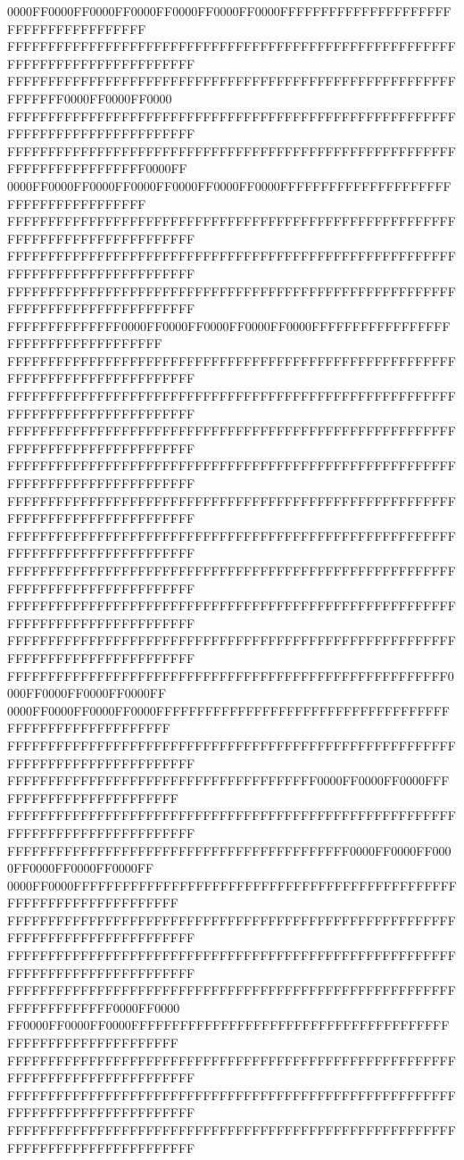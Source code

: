 0000FF0000FF0000FF0000FF0000FF0000FF0000FFFFFFFFFFFFFFFFFFFFFFFFFFFFFFFFFFFFFF
FFFFFFFFFFFFFFFFFFFFFFFFFFFFFFFFFFFFFFFFFFFFFFFFFFFFFFFFFFFFFFFFFFFFFFFFFFFFFF
FFFFFFFFFFFFFFFFFFFFFFFFFFFFFFFFFFFFFFFFFFFFFFFFFFFFFFFFFFFFFF0000FF0000FF0000
FFFFFFFFFFFFFFFFFFFFFFFFFFFFFFFFFFFFFFFFFFFFFFFFFFFFFFFFFFFFFFFFFFFFFFFFFFFFFF
FFFFFFFFFFFFFFFFFFFFFFFFFFFFFFFFFFFFFFFFFFFFFFFFFFFFFFFFFFFFFFFFFFFFFFFF0000FF
0000FF0000FF0000FF0000FF0000FF0000FF0000FFFFFFFFFFFFFFFFFFFFFFFFFFFFFFFFFFFFFF
FFFFFFFFFFFFFFFFFFFFFFFFFFFFFFFFFFFFFFFFFFFFFFFFFFFFFFFFFFFFFFFFFFFFFFFFFFFFFF
FFFFFFFFFFFFFFFFFFFFFFFFFFFFFFFFFFFFFFFFFFFFFFFFFFFFFFFFFFFFFFFFFFFFFFFFFFFFFF
FFFFFFFFFFFFFFFFFFFFFFFFFFFFFFFFFFFFFFFFFFFFFFFFFFFFFFFFFFFFFFFFFFFFFFFFFFFFFF
FFFFFFFFFFFFFF0000FF0000FF0000FF0000FF0000FFFFFFFFFFFFFFFFFFFFFFFFFFFFFFFFFFFF
FFFFFFFFFFFFFFFFFFFFFFFFFFFFFFFFFFFFFFFFFFFFFFFFFFFFFFFFFFFFFFFFFFFFFFFFFFFFFF
FFFFFFFFFFFFFFFFFFFFFFFFFFFFFFFFFFFFFFFFFFFFFFFFFFFFFFFFFFFFFFFFFFFFFFFFFFFFFF
FFFFFFFFFFFFFFFFFFFFFFFFFFFFFFFFFFFFFFFFFFFFFFFFFFFFFFFFFFFFFFFFFFFFFFFFFFFFFF
FFFFFFFFFFFFFFFFFFFFFFFFFFFFFFFFFFFFFFFFFFFFFFFFFFFFFFFFFFFFFFFFFFFFFFFFFFFFFF
FFFFFFFFFFFFFFFFFFFFFFFFFFFFFFFFFFFFFFFFFFFFFFFFFFFFFFFFFFFFFFFFFFFFFFFFFFFFFF
FFFFFFFFFFFFFFFFFFFFFFFFFFFFFFFFFFFFFFFFFFFFFFFFFFFFFFFFFFFFFFFFFFFFFFFFFFFFFF
FFFFFFFFFFFFFFFFFFFFFFFFFFFFFFFFFFFFFFFFFFFFFFFFFFFFFFFFFFFFFFFFFFFFFFFFFFFFFF
FFFFFFFFFFFFFFFFFFFFFFFFFFFFFFFFFFFFFFFFFFFFFFFFFFFFFFFFFFFFFFFFFFFFFFFFFFFFFF
FFFFFFFFFFFFFFFFFFFFFFFFFFFFFFFFFFFFFFFFFFFFFFFFFFFFFFFFFFFFFFFFFFFFFFFFFFFFFF
FFFFFFFFFFFFFFFFFFFFFFFFFFFFFFFFFFFFFFFFFFFFFFFFFFFFFF0000FF0000FF0000FF0000FF
0000FF0000FF0000FF0000FFFFFFFFFFFFFFFFFFFFFFFFFFFFFFFFFFFFFFFFFFFFFFFFFFFFFFFF
FFFFFFFFFFFFFFFFFFFFFFFFFFFFFFFFFFFFFFFFFFFFFFFFFFFFFFFFFFFFFFFFFFFFFFFFFFFFFF
FFFFFFFFFFFFFFFFFFFFFFFFFFFFFFFFFFFFFF0000FF0000FF0000FFFFFFFFFFFFFFFFFFFFFFFF
FFFFFFFFFFFFFFFFFFFFFFFFFFFFFFFFFFFFFFFFFFFFFFFFFFFFFFFFFFFFFFFFFFFFFFFFFFFFFF
FFFFFFFFFFFFFFFFFFFFFFFFFFFFFFFFFFFFFFFFFF0000FF0000FF0000FF0000FF0000FF0000FF
0000FF0000FFFFFFFFFFFFFFFFFFFFFFFFFFFFFFFFFFFFFFFFFFFFFFFFFFFFFFFFFFFFFFFFFFFF
FFFFFFFFFFFFFFFFFFFFFFFFFFFFFFFFFFFFFFFFFFFFFFFFFFFFFFFFFFFFFFFFFFFFFFFFFFFFFF
FFFFFFFFFFFFFFFFFFFFFFFFFFFFFFFFFFFFFFFFFFFFFFFFFFFFFFFFFFFFFFFFFFFFFFFFFFFFFF
FFFFFFFFFFFFFFFFFFFFFFFFFFFFFFFFFFFFFFFFFFFFFFFFFFFFFFFFFFFFFFFFFFFF0000FF0000
FF0000FF0000FF0000FFFFFFFFFFFFFFFFFFFFFFFFFFFFFFFFFFFFFFFFFFFFFFFFFFFFFFFFFFFF
FFFFFFFFFFFFFFFFFFFFFFFFFFFFFFFFFFFFFFFFFFFFFFFFFFFFFFFFFFFFFFFFFFFFFFFFFFFFFF
FFFFFFFFFFFFFFFFFFFFFFFFFFFFFFFFFFFFFFFFFFFFFFFFFFFFFFFFFFFFFFFFFFFFFFFFFFFFFF
FFFFFFFFFFFFFFFFFFFFFFFFFFFFFFFFFFFFFFFFFFFFFFFFFFFFFFFFFFFFFFFFFFFFFFFFFFFFFF
